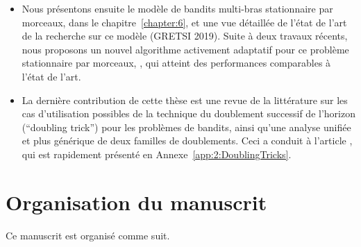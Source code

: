\begin{resume_fr}
\begin{itemize}
    \item
    Nous présentons ensuite le modèle de bandits multi-bras stationnaire par morceaux, dans le chapitre~\ref{chapter:6}, et une vue détaillée de l'état de l'art de la recherche sur ce modèle \cite{Besson2019GLRT,Besson2019Gretsi} (GRETSI 2019).
    Suite à deux travaux récents, nous proposons un nouvel algorithme activement adaptatif pour ce problème stationnaire par morceaux, \GLRklUCB, qui atteint des performances comparables à l'état de l'art.

    \item
    La dernière contribution de cette thèse est une revue de la littérature sur les cas d'utilisation possibles de la technique du doublement successif de l'horizon (``doubling trick'') pour les problèmes de bandits,
    ainsi qu'une analyse unifiée et plus générique de deux familles de doublements.
    Ceci a conduit à l'article \cite{Besson2018DoublingTricks}, qui est rapidement présenté en Annexe~\ref{app:2:DoublingTricks}.
\end{itemize}

\section*{Organisation du manuscrit}

Ce manuscrit est organisé comme suit.


\end{resume_fr}
